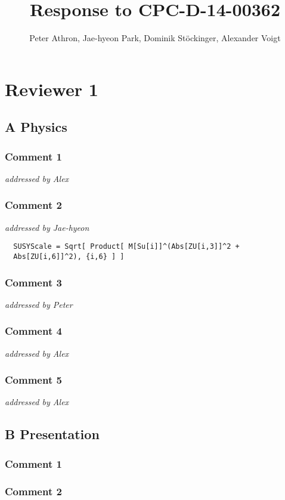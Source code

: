 \documentclass[a4paper,11pt,twocolumn]{article}
\title{Response to CPC-D-14-00362}
\author{Peter Athron, Jae-hyeon Park, Dominik St\"ockinger, Alexander Voigt}
\newcommand{\remark}[1]{\emph{#1}}
\begin{document}
\maketitle

\section{Reviewer 1}
\subsection{A Physics}
\subsubsection{Comment 1}
\remark{addressed by Alex}

\subsubsection{Comment 2}
\remark{addressed by Jae-hyeon}
\begin{lstlisting}
  SUSYScale = Sqrt[ Product[ M[Su[i]]^(Abs[ZU[i,3]]^2 +
  Abs[ZU[i,6]]^2), {i,6} ] ]
\end{lstlisting}

\subsubsection{Comment 3}
\remark{addressed by Peter}

\subsubsection{Comment 4}
\remark{addressed by Alex}

\subsubsection{Comment 5}
\remark{addressed by Alex}

\subsection{B Presentation}

\subsubsection{Comment 1}
\subsubsection{Comment 2}
\end{document}
